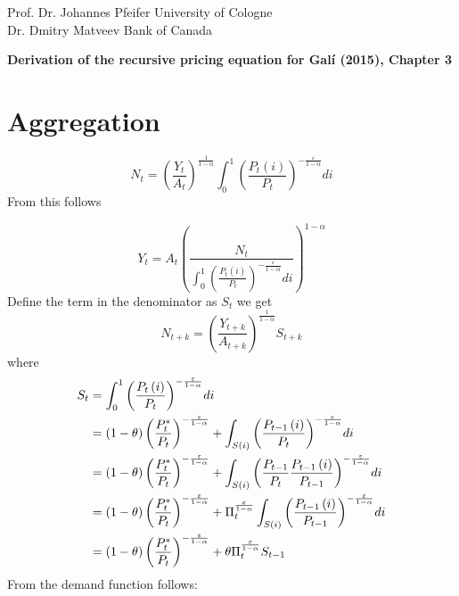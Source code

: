 \documentclass[12pt,a4paper]{article}
\begin{document}
\noindent Prof. Dr. Johannes Pfeifer \hfill University of Cologne \\
Dr. Dmitry Matveev \hfill Bank of Canada
\vspace{0.4cm}

\begin{center}
\textbf{\Large{Derivation of the recursive pricing equation for Galí (2015), Chapter 3}}\\
\end{center}
\section{Aggregation}
\begin{equation}
{N_t} = {\left( {\frac{{{Y_t}}}{{{A_t}}}} \right)^{\frac{1}{{1 - \alpha }}}}\int_0^1 {{{\left( {\frac{{{P_t}\left( i \right)}}{{{P_t}}}} \right)}^{ - \frac{\varepsilon }{{1 - \alpha }}}}di}
\end{equation}
From this follows

\begin{equation}
{Y_t} = {A_t}{\left( {\frac{{{N_t}}}{{\int_0^1 {{{\left( {\frac{{{P_t}\left( i \right)}}{{{P_t}}}} \right)}^{ - \frac{\varepsilon }{{1 - \alpha }}}}di} }}} \right)^{1 - \alpha }}
\end{equation}
Define the term in the denominator as $S_t$
we get
\begin{equation}{N_{t + k}} = {\left( {\frac{{{Y_{t + k}}}}{{{A_{t + k}}}}} \right)^{\frac{1}{{1 - \alpha }}}}{S_{t+k}}\end{equation}
where
\begin{align}
  {S_t} &= \int_0^1 {{{\left( {\frac{{{P_t}\left( i \right)}}{{{P_t}}}} \right)}^{ - \frac{\varepsilon }{{1 - \alpha }}}}di}  \hfill \\
   &= \left( {1 - \theta } \right){\left( {\frac{{P_t^*}}{{{P_t}}}} \right)^{ - \frac{\varepsilon }{{1 - \alpha }}}} + \int_{S\left( i \right)}^{} {{{\left( {\frac{{{P_{t - 1}}\left( i \right)}}{{{P_t}}}} \right)}^{ - \frac{\varepsilon }{{1 - \alpha }}}}di}  \\
   &= \left( {1 - \theta } \right){\left( {\frac{{P_t^*}}{{{P_t}}}} \right)^{ - \frac{\varepsilon }{{1 - \alpha }}}} + \int_{S\left( i \right)}^{} {{{\left( {\frac{{{P_{t - 1}}}}{{{P_t}}}\frac{{{P_{t - 1}}\left( i \right)}}{{{P_{t - 1}}}}} \right)}^{ - \frac{\varepsilon }{{1 - \alpha }}}}di}  \hfill \\
   &= \left( {1 - \theta } \right){\left( {\frac{{P_t^*}}{{{P_t}}}} \right)^{ - \frac{\varepsilon }{{1 - \alpha }}}} + \Pi _t^{\frac{\varepsilon }{{1 - \alpha }}}\int_{S\left( i \right)}^{} {{{\left( {\frac{{{P_{t - 1}}\left( i \right)}}{{{P_{t - 1}}}}} \right)}^{ - \frac{\varepsilon }{{1 - \alpha }}}}di}  \\
   &= \left( {1 - \theta } \right){\left( {\frac{{P_t^*}}{{{P_t}}}} \right)^{ - \frac{\varepsilon }{{1 - \alpha }}}} + \theta \Pi _t^{\frac{\varepsilon }{{1 - \alpha }}}{S_{t - 1}}
\end{align}
From the demand function follows:
\end{document}
